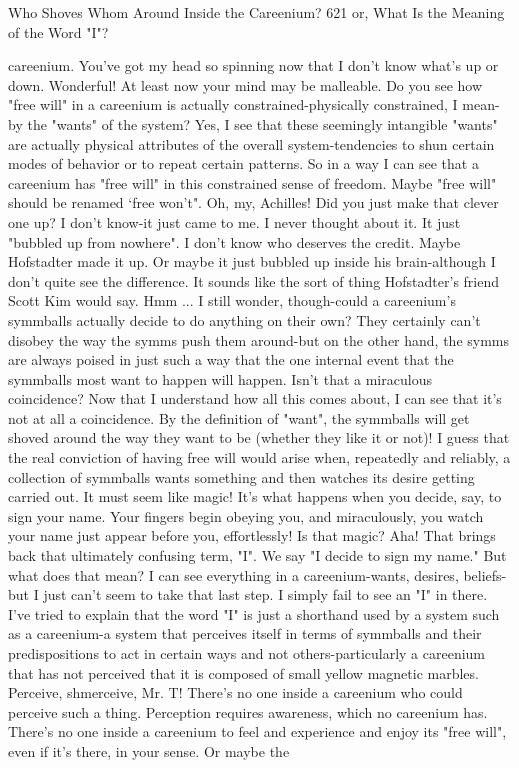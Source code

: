 Who Shoves Whom Around Inside the Careenium?                                          621
or, What Is the Meaning of the Word "I"?

  careenium. You've got my head so spinning now that I don't know what's up or
  down.
\tortoise Wonderful! At least now your mind may be malleable. Do you see how
  "free will" in a careenium is actually constrained-physically constrained, I mean-by
  the "wants" of the system?
\achilles Yes, I see that these seemingly intangible "wants" are actually physical
  attributes of the overall system-tendencies to shun certain modes of behavior or to
  repeat certain patterns. So in a way I can see that a careenium has "free will" in this
  constrained sense of freedom. Maybe "free will" should be renamed `free won't".
\tortoise Oh, my, Achilles! Did you just make that clever one up?
\achilles I don't know-it just came to me. I never thought about it. It just "bubbled
  up from nowhere". I don't know who deserves the credit. Maybe Hofstadter made
  it up. Or maybe it just bubbled up inside his brain-although I don't quite see the
  difference.
\tortoise It sounds like the sort of thing Hofstadter's friend Scott Kim would say.
\achilles Hmm ... I still wonder, though-could a careenium's symmballs actually
  decide to do anything on their own?
\tortoise They certainly can't disobey the way the symms push them around-but
  on the other hand, the symms are always poised in just such a way that the one
  internal event that the symmballs most want to happen will happen. Isn't that a
  miraculous coincidence?
\achilles Now that I understand how all this comes about, I can see that it's not at
  all a coincidence. By the definition of "want", the symmballs will get shoved
  around the way they want to be (whether they like it or not)! I guess that the real
  conviction of having free will would arise when, repeatedly and reliably, a
  collection of symmballs wants something and then watches its desire getting
  carried out. It must seem like magic!
\tortoise It's what happens when you decide, say, to sign your name. Your fingers
  begin obeying you, and miraculously, you watch your name just appear before you,
  effortlessly! Is that magic?
\achilles Aha! That brings back that ultimately confusing term, "I". We say "I
  decide to sign my name." But what does that mean? I can see everything in a
  careenium-wants, desires, beliefs-but I just can't seem to take that last step. I
  simply fail to see an "I" in there.
\tortoise I've tried to explain that the word "I" is just a shorthand used by a system
  such as a careenium-a system that perceives itself in terms of symmballs and their
  predispositions to act in certain ways and not others-particularly a careenium that
  has not perceived that it is composed of small yellow magnetic marbles.
\achilles Perceive, shmerceive, Mr. T! There's no one inside a careenium who
  could perceive such a thing. Perception requires awareness, which no careenium
  has. There's no one inside a careenium to feel and experience and enjoy its "free
  will", even if it's there, in your sense. Or maybe the




